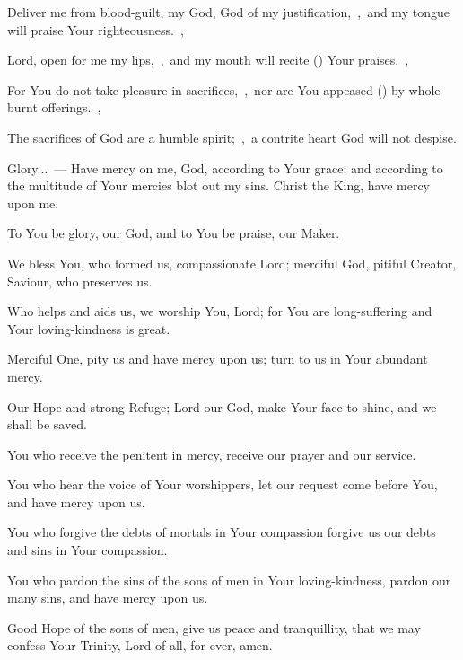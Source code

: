 \documentclass[12pt,twoside,a5paper]{article}
\begin{document}
\begin{halfparskip}
  Deliver me from blood-guilt, my God, God of my justification,~\sep\ and my tongue will praise Your righteousness.~\sep

  Lord, open for me my lips,~\sep\ and my mouth will recite () Your praises.~\sep

  For You do not take pleasure in sacrifices,~\sep\ nor are You appeased () by whole burnt offerings.~\sep

  The sacrifices of God are a humble spirit;~\sep\ a contrite heart God will not despise.

  Glory...~---  Have mercy on me, God, according to Your grace; and according to the multitude of Your mercies blot out my sins. Christ the King, have mercy upon me.
\end{halfparskip}




\begin{halfparskip}
  To You be glory, our God, and to You be praise, our Maker.

  We bless You, who formed us, compassionate Lord; merciful God, pitiful Creator, Saviour, who preserves us.

  Who helps and aids us, we worship You, Lord; for You are long-suffering and Your loving-kindness is great.

  Merciful One, pity us and have mercy upon us; turn to us in Your abundant mercy.

  Our Hope and strong Refuge; Lord our God, make Your face to shine, and we shall be saved.

  You who receive the penitent in mercy, receive our prayer and our service.

  You who hear the voice of Your worshippers, let our request come before You, and have mercy upon us.

  You who forgive the debts of mortals in Your compassion forgive us our debts and sins in Your compassion.

  You who pardon the sins of the sons of men in Your loving-kindness, pardon our many sins, and have mercy upon us.

  Good Hope of the sons of men, give us peace and tranquillity, that we may confess Your Trinity, Lord of all, for ever, amen. 
\end{halfparskip}
\end{document}

